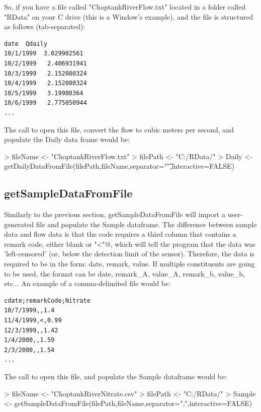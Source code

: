 \documentclass[a4paper,11pt]{article}
\begin{document}
So, if you have a file called "ChoptankRiverFlow.txt" located in a folder called "RData" on your C drive (this is a Window's example), and the file is structured as follows (tab-separated):
\begin{verbatim}
date  Qdaily
10/1/1999  3.029902561
10/2/1999	2.406931941
10/3/1999	2.152080324
10/4/1999	2.152080324
10/5/1999	3.19980364
10/6/1999	2.775050944
...
\end{verbatim}

The call to open this file, convert the flow to cubic meters per second, and populate the Daily data frame would be:
\begin{Schunk}
\begin{Sinput}
> fileName <- "ChoptankRiverFlow.txt"
> filePath <-  "C:/RData/"
> Daily <- getDailyDataFromFile(filePath,fileName,separator="\t",interactive=FALSE)
\end{Sinput}
\end{Schunk}

\subsection{getSampleDataFromFile}
Similarly to the previous section, getSampleDataFromFile will import a user-generated file and populate the Sample dataframe. The difference between sample data and flow data is that the code requires a third column that contains a remark code, either blank or \verb@"<"@, which will tell the program that the data was 'left-censored' (or, below the detection limit of the sensor). Therefore, the data is required to be in the form: date, remark, value.  If multiple constituents are going to be used, the format can be date, remark\_A, value\_A, remark\_b, value\_b, etc... An example of a comma-delimited file would be:

\begin{verbatim}
cdate;remarkCode;Nitrate
10/7/1999,,1.4
11/4/1999,<,0.99
12/3/1999,,1.42
1/4/2000,,1.59
2/3/2000,,1.54
...
\end{verbatim}
The call to open this file, and populate the Sample dataframe would be:
\begin{Schunk}
\begin{Sinput}
> fileName <- "ChoptankRiverNitrate.csv"
> filePath <-  "C:/RData/"
> Sample <- getSampleDataFromFile(filePath,fileName,separator=",",interactive=FALSE)
\end{Sinput}
\end{Schunk}
\end{document}
